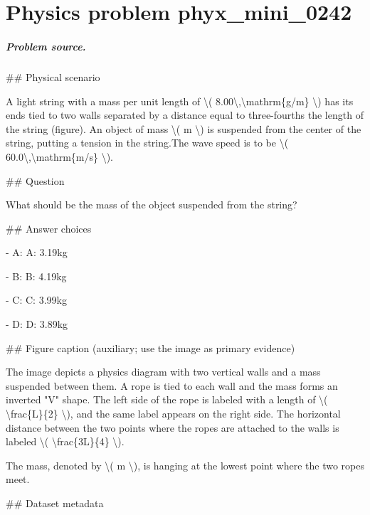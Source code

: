 
\chapter{Physics problem phyx\_mini\_0242}
\label{ch:PhyXMiniProblems_problem_phyx_mini_0242}

\paragraph{Problem source.}
\#\# Physical scenario

A light string with a mass per unit length of \textbackslash{}( 8.00\textbackslash{},\textbackslash{}mathrm\{g/m\} \textbackslash{}) has its ends tied to two walls separated by a distance equal to three-fourths the length of the string (figure). An object of mass \textbackslash{}( m \textbackslash{}) is suspended from the center of the string, putting a tension in the string.The wave speed is to be \textbackslash{}( 60.0\textbackslash{},\textbackslash{}mathrm\{m/s\} \textbackslash{}).

\#\# Question

What should be the mass of the object suspended from the string?

\#\# Answer choices

- A: A: 3.19kg

- B: B: 4.19kg

- C: C: 3.99kg

- D: D: 3.89kg

\#\# Figure caption (auxiliary; use the image as primary evidence)

The image depicts a physics diagram with two vertical walls and a mass suspended between them. A rope is tied to each wall and the mass forms an inverted "V" shape. The left side of the rope is labeled with a length of \textbackslash{}( \textbackslash{}frac\{L\}\{2\} \textbackslash{}), and the same label appears on the right side. The horizontal distance between the two points where the ropes are attached to the walls is labeled \textbackslash{}( \textbackslash{}frac\{3L\}\{4\} \textbackslash{}).

The mass, denoted by \textbackslash{}( m \textbackslash{}), is hanging at the lowest point where the two ropes meet.

\#\# Dataset metadata

